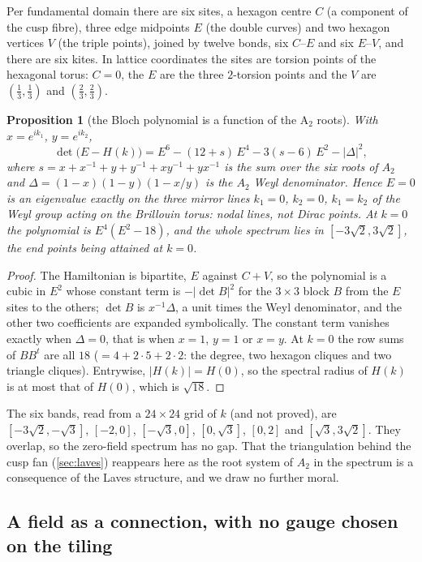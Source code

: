 \documentclass[11pt,a4paper]{article}
\theoremstyle{plain}
\newtheorem{proposition}{Proposition}
\theoremstyle{definition}
\begin{document}
Per fundamental domain there are six sites, a hexagon centre $C$ (a component of the cusp fibre), three
edge midpoints $E$ (the double curves) and two hexagon vertices $V$ (the triple points), joined
by twelve bonds, six $C$--$E$ and six $E$--$V$, and there are six kites. In lattice
coordinates the sites are torsion points of the hexagonal torus: $C=0$, the $E$ are the three
$2$-torsion points and the $V$ are $(\tfrac13,\tfrac13)$ and $(\tfrac23,\tfrac23)$.

\begin{proposition}[the Bloch polynomial is a function of the A$_2$ roots]
\label{prop:ho-bands}
With $x=e^{ik_1}$, $y=e^{ik_2}$,
\[
  \det\bigl(E-H(k)\bigr)=E^6-(12+s)\,E^4-3(s-6)\,E^2-\lvert\Delta\rvert^2,
\]
where $s=x+x^{-1}+y+y^{-1}+xy^{-1}+yx^{-1}$ is the sum over the six roots of $A_2$ and
$\Delta=(1-x)(1-y)(1-x/y)$ is the $A_2$ Weyl denominator. Hence $E=0$ is an eigenvalue exactly on the three mirror
lines $k_1=0$, $k_2=0$, $k_1=k_2$ of the Weyl group acting on the Brillouin torus: nodal
\emph{lines}, not Dirac points. At $k=0$ the polynomial is $E^4(E^2-18)$, and the whole spectrum lies in
$[-3\sqrt2,3\sqrt2]$, the end points being attained at $k=0$.
\end{proposition}

\begin{proof}
The Hamiltonian is bipartite, $E$ against $C+V$, so the polynomial is a cubic in $E^2$ whose
constant term is $-\lvert\det B\rvert^2$ for the $3\times3$ block $B$ from the $E$ sites to the others;
$\det B$ is $x^{-1}\Delta$, a unit times the Weyl denominator, and the other two coefficients are
expanded symbolically. The constant term vanishes exactly when $\Delta=0$, that is when $x=1$, $y=1$ or $x=y$. At $k=0$ the
row sums of $BB^t$ are all $18$ ($=4+2\cdot5+2\cdot2$: the degree, two hexagon cliques and two
triangle cliques). Entrywise, $\lvert H(k)\rvert=H(0)$, so the spectral radius of $H(k)$ is at most that of $H(0)$,
which is $\sqrt{18}$.
\end{proof}

The six bands, read from a $24\times24$ grid of $k$ (and not proved), are
$[-3\sqrt2,-\sqrt3]$, $[-2,0]$, $[-\sqrt3,0]$, $[0,\sqrt3]$, $[0,2]$ and $[\sqrt3,3\sqrt2]$. They overlap, so the zero-field spectrum has no
gap. That the triangulation behind the cusp fan (\cref{sec:laves}) reappears here as the root
system of $A_2$ in the spectrum is a consequence of the Laves structure, and we draw no further moral.

\subsection{A field as a connection, with no gauge chosen on the tiling}
\end{document}
